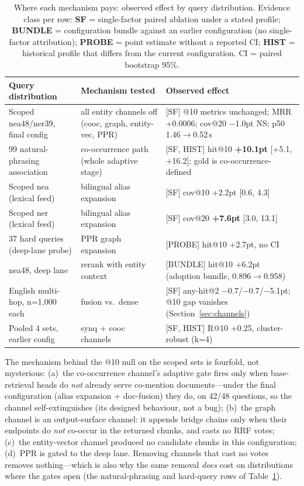 \documentclass[sigconf,nonacm]{acmart}
\begin{document}
\begin{table}[!t]
\centering
\caption{Where each mechanism pays: observed effect by query
distribution. Evidence class per row: \textbf{SF} = single-factor
paired ablation under a stated profile; \textbf{BUNDLE} = configuration
bundle against an earlier configuration (no single-factor
attribution); \textbf{PROBE} = point estimate without a reported CI;
\textbf{HIST} = historical profile that differs from the current
configuration. CI = paired bootstrap 95\%.}
\label{tab:channmatrix}
\small
\begin{tabular}{p{}p{}p{}}
\toprule
Query distribution & Mechanism tested & Observed effect \\
\midrule
Scoped nea48/ner39, final config & all entity channels off (cooc, graph, entity-vec, PPR) & [SF] @10 metrics unchanged; MRR +0.0006; cov@20 $-$1.0pt NS; p50 1.46$\to$0.52\,s \\
99 natural-phrasing association & co-occurrence path (whole adaptive stage) & [SF, HIST] hit@10 \textbf{+10.1pt} [+5.1, +16.2]; gold is co-occurrence-defined \\
Scoped nea (lexical feed) & bilingual alias expansion & [SF] cov@10 +2.2pt [0.6, 4.3] \\
Scoped ner (lexical feed) & bilingual alias expansion & [SF] cov@20 \textbf{+7.6pt} [3.0, 13.1] \\
37 hard queries (deep-lane probe) & PPR graph expansion & [PROBE] hit@10 +2.7pt, no CI \\
nea48, deep lane & rerank with entity context & [BUNDLE] hit@10 +6.2pt (adoption bundle, 0.896$\to$0.958) \\
English multi-hop, n=1{,}000 each & fusion vs.\ dense & [SF] any-hit@2 $-$0.7/$-$0.7/$-$5.1pt; @10 gap vanishes (Section~\ref{sec:channels}) \\
Pooled 4 sets, earlier config & synq + cooc channels & [SF, HIST] R@10 +0.25, cluster-robust (k=4) \\
\bottomrule
\end{tabular}
\end{table}

The mechanism behind the @10 null on the scoped sets is
fourfold, not mysterious: (a)~the co-occurrence channel's adaptive gate
fires only when base-retrieval heads do \emph{not} already serve
co-mention documents---under the final configuration (alias expansion +
doc-fusion) they do, on 42/48 questions, so the channel self-extinguishes
(its designed behaviour, not a bug); (b)~the graph channel is an
output-surface channel: it appends bridge chains only when their
endpoints do \emph{not} co-occur in the returned chunks, and casts no RRF
votes; (c)~the entity-vector channel produced no candidate chunks in this
configuration; (d)~PPR is gated to the deep lane. Removing channels that
cast no votes removes nothing---which is also why the same removal
\emph{does} cost on distributions where the gates open
(the natural-phrasing and hard-query rows of Table~\ref{tab:channmatrix}).
\end{document}

